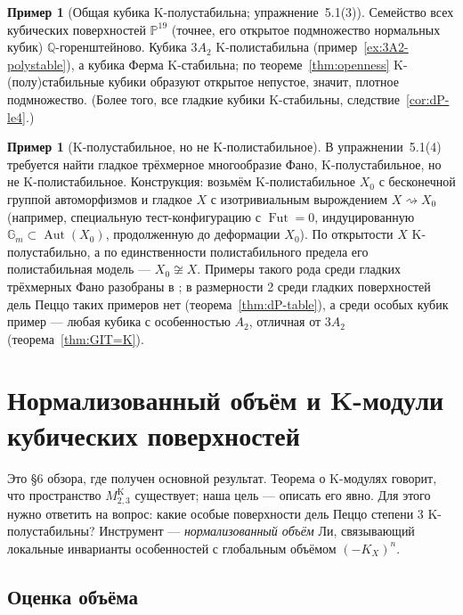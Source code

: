 \documentclass[11pt,a4paper]{article}
\theoremstyle{plain}
\theoremstyle{definition}
\newtheorem{example}[theorem]{Пример}
\theoremstyle{remark}
\newcommand{\Q}{\mathbb{Q}}
\newcommand{\PP}{\mathbb{P}}
\newcommand{\Gm}{\mathbb{G}_m}
\DeclareMathOperator{\Aut}{Aut}
\DeclareMathOperator{\Fut}{Fut}
\begin{document}
\begin{example}[Общая кубика K-полустабильна; упражнение~5.1(3)]
Семейство всех кубических поверхностей $\PP^{19}$ (точнее, его открытое подмножество нормальных
кубик) $\Q$-горенштейново. Кубика $3A_2$ K-полистабильна (пример~\ref{ex:3A2-polystable}), а кубика
Ферма K-стабильна; по теореме~\ref{thm:openness} K-(полу)стабильные кубики образуют открытое
непустое, значит, плотное подмножество. (Более того, все гладкие кубики K-стабильны,
следствие~\ref{cor:dP-le4}.)
\end{example}

\begin{example}[K-полустабильное, но не K-полистабильное]
В упражнении~5.1(4) требуется найти гладкое трёхмерное многообразие Фано, K-полустабильное, но не
K-полистабильное. Конструкция: возьмём K-полистабильное $X_0$ с бесконечной группой автоморфизмов и
гладкое $X$ с изотривиальным вырождением $X\rightsquigarrow X_0$ (например, специальную
тест-конфигурацию с $\Fut=0$, индуцированную $\Gm\subset\Aut(X_0)$, продолженную до деформации $X_0$).
По открытости $X$ K-полустабильно, а по единственности полистабильного предела его полистабильная
модель --- $X_0\not\cong X$. Примеры такого рода среди гладких трёхмерных Фано разобраны в \cite{ACCFKMSV}; в размерности 2 среди гладких поверхностей дель Пеццо таких примеров нет (теорема~\ref{thm:dP-table}),
а среди особых кубик пример --- любая кубика с особенностью $A_2$, отличная от $3A_2$
(теорема~\ref{thm:GIT=K}).
\end{example}

\section{Нормализованный объём и K-модули кубических поверхностей}\label{sec:cubic}

Это \S6 обзора, где получен основной результат. Теорема о K-модулях говорит, что пространство
$M^{\mathrm K}_{2,3}$ существует; наша цель --- описать его явно. Для этого нужно ответить на вопрос:
какие особые поверхности дель Пеццо степени 3 K-полустабильны? Инструмент --- \emph{нормализованный
объём} Ли, связывающий локальные инварианты особенностей с глобальным объёмом $(-K_X)^n$.

\subsection{Оценка объёма}
\end{document}
